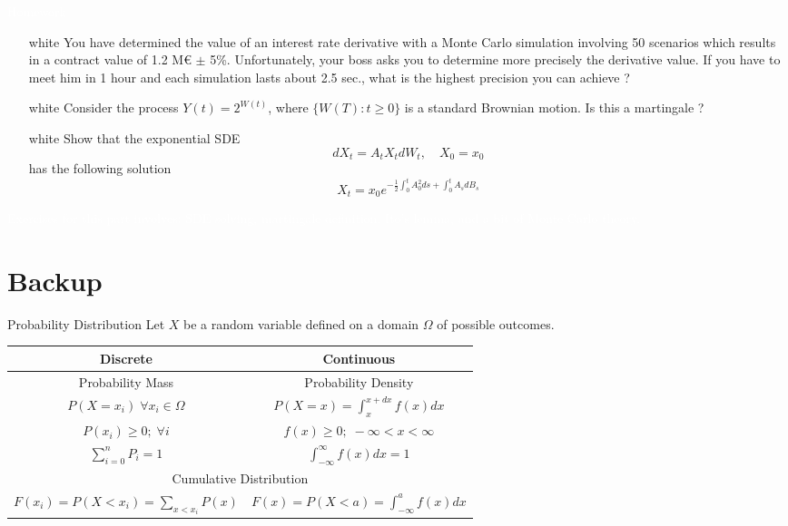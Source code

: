 \documentclass{beamer}
\begin{document}
\begin{homework}
\begin{frame}{\textcolor{white}{Homework}}
\begin{itemize}
\item[white]  You have determined the value of an interest rate derivative with a Monte Carlo simulation involving 50 scenarios which results in a contract value of 1.2 M€ $\pm$ 5\%. Unfortunately, your boss asks you to determine more precisely the derivative value. If you have to meet him in 1 hour and each simulation lasts about 2.5 sec., what is the highest precision you can achieve ?
\item[white] Consider the process $Y(t) = 2^{W(t)}$, where $\{W(T):t\geq 0\}$ is a standard Brownian motion. Is this a martingale ?
\item[white]  Show that the exponential SDE
\begin{equation*}
dX_t = A_t X_tdW_t,\quad X_0=x_0
\end{equation*}
has the following solution
\begin{equation*}
X_t = x_0 e^{-\frac{1}{2}\int_0^t A_0^2 ds+\int_0^t A_s dB_s}
\end{equation*}
\end{itemize}
\textcolor{white}{Exercises for this part involves: SDE solving, martingale definition, Ito's lemma, and a bit of Monte Carlo theory.}
\end{frame}
\end{homework}

\section{Backup}

\begin{frame}{Probability Distribution}
	Let $X$ be a random variable defined on a domain $\Omega$ of possible outcomes. 
	\renewcommand{\arraystretch}{1.6}
	\begin{table}[bt]
		\begin{tabular}{|c|c|} \hline
			\textbf{Discrete} & \textbf{Continuous} \\ \hline
			Probability Mass & Probability Density \\ \hline		
			$P(X=x_i)\;\forall x_i\in\Omega$ & $P(X=x)=\int_x^{x+dx}f(x)dx$ \\ \hline
			$P(x_i) \geq 0;\;\forall i$ & $f(x) \geq 0;\;-\infty < x < \infty$\\ \hline
			$\sum_{i=0}^{n} P_i = 1$ & $\int_{-\infty}^{\infty} f(x) dx = 1$\\ \hline
			\multicolumn{2}{|c|}{Cumulative Distribution} \\ \hline
			$F(x_i) = P(X<x_i) = \sum_{x<x_i} P(x)$ & $F(x) = P(X<a) = \int_{-\infty}^{a} f(x) dx$ \\ \hline
		\end{tabular}
	\end{table}
\end{frame}
\end{document}

